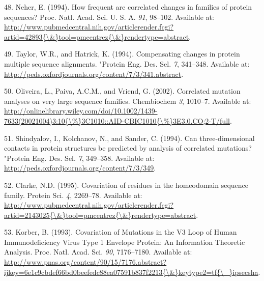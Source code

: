 \documentclass[11pt,a4paper,twoside]{book}
\theoremstyle{definition}
\theoremstyle{definition}
\theoremstyle{remark}
\begin{document}
\hypertarget{ref-Neher1994}{}
48. Neher, E. (1994). How frequent are correlated changes in families of
protein sequences? Proc. Natl. Acad. Sci. U. S. A. \emph{91}, 98--102.
Available at:
\href{http://www.pubmedcentral.nih.gov/articlerender.fcgi?artid=42893\%7B/\&\%7Dtool=pmcentrez\%7B/\&\%7Drendertype=abstract}{http://www.pubmedcentral.nih.gov/articlerender.fcgi?artid=42893\{\textbackslash{}\&\}tool=pmcentrez\{\textbackslash{}\&\}rendertype=abstract}.

\hypertarget{ref-Taylor1994}{}
49. Taylor, W.R., and Hatrick, K. (1994). Compensating changes in
protein multiple sequence alignments. "Protein Eng. Des. Sel. \emph{7},
341--348. Available at:
\url{http://peds.oxfordjournals.org/content/7/3/341.abstract}.

\hypertarget{ref-Oliveira2002}{}
50. Oliveira, L., Paiva, A.C.M., and Vriend, G. (2002). Correlated
mutation analyses on very large sequence families. Chembiochem \emph{3},
1010--7. Available at:
\href{http://onlinelibrary.wiley.com/doi/10.1002/1439-7633(20021004)3:10\%7B/\%\%7D3C1010::AID-CBIC1010\%7B/\%\%7D3E3.0.CO;2-T/full}{http://onlinelibrary.wiley.com/doi/10.1002/1439-7633(20021004)3:10\{\textbackslash{}\%\}3C1010::AID-CBIC1010\{\textbackslash{}\%\}3E3.0.CO;2-T/full}.

\hypertarget{ref-Shindyalov1994}{}
51. Shindyalov, I., Kolchanov, N., and Sander, C. (1994). Can
three-dimensional contacts in protein structures be predicted by
analysis of correlated mutations? "Protein Eng. Des. Sel. \emph{7},
349--358. Available at:
\url{http://peds.oxfordjournals.org/content/7/3/349}.

\hypertarget{ref-Clarke1995}{}
52. Clarke, N.D. (1995). Covariation of residues in the homeodomain
sequence family. Protein Sci. \emph{4}, 2269--78. Available at:
\href{http://www.pubmedcentral.nih.gov/articlerender.fcgi?artid=2143025\%7B/\&\%7Dtool=pmcentrez\%7B/\&\%7Drendertype=abstract}{http://www.pubmedcentral.nih.gov/articlerender.fcgi?artid=2143025\{\textbackslash{}\&\}tool=pmcentrez\{\textbackslash{}\&\}rendertype=abstract}.

\hypertarget{ref-Korber1993}{}
53. Korber, B. (1993). Covariation of Mutations in the V3 Loop of Human
Immunodeficiency Virus Type 1 Envelope Protein: An Information Theoretic
Analysis. Proc. Natl. Acad. Sci. \emph{90}, 7176--7180. Available at:
\href{http://www.pnas.org/content/90/15/7176.abstract?ijkey=6e1c9cbdef66bd0beefedc88ea07591b837f2213\%7B/\&\%7Dkeytype2=tf\%7B/_\%7Dipsecsha}{http://www.pnas.org/content/90/15/7176.abstract?ijkey=6e1c9cbdef66bd0beefedc88ea07591b837f2213\{\textbackslash{}\&\}keytype2=tf\{\textbackslash{}\_\}ipsecsha}.
\end{document}
